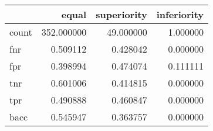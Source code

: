 \begin{tabular}{lrrr}
\toprule
{} &       equal &  superiority &  inferiority \\
\midrule
count &  352.000000 &    49.000000 &     1.000000 \\
fnr   &    0.509112 &     0.428042 &     0.000000 \\
fpr   &    0.398994 &     0.474074 &     0.111111 \\
tnr   &    0.601006 &     0.414815 &     0.000000 \\
tpr   &    0.490888 &     0.460847 &     0.000000 \\
bacc  &    0.545947 &     0.363757 &     0.000000 \\
\bottomrule
\end{tabular}
